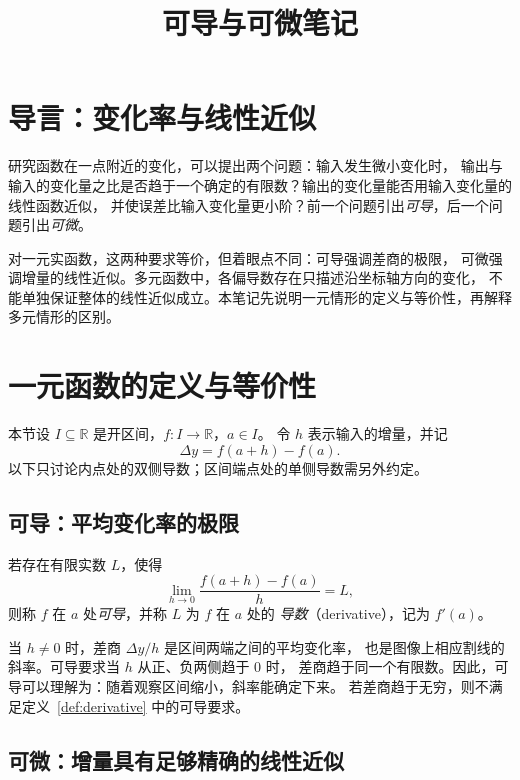 \documentclass[UTF8,12pt,a4paper,fontset=fandol]{ctexart}
\title{可导与可微笔记}
\author{}
\date{}
\begin{document}
\maketitle

\section{导言：变化率与线性近似}
\label{sec:motivation}

研究函数在一点附近的变化，可以提出两个问题：输入发生微小变化时，
输出与输入的变化量之比是否趋于一个确定的有限数？输出的变化量能否用输入变化量的线性函数近似，
并使误差比输入变化量更小阶？前一个问题引出\emph{可导}，后一个问题引出\emph{可微}。

对一元实函数，这两种要求等价，但着眼点不同：可导强调差商的极限，
可微强调增量的线性近似。多元函数中，各偏导数存在只描述沿坐标轴方向的变化，
不能单独保证整体的线性近似成立。本笔记先说明一元情形的定义与等价性，再解释多元情形的区别。

\section{一元函数的定义与等价性}
\label{sec:one-variable}

本节设 $I\subseteq\mathbb R$ 是开区间，$f:I\to\mathbb R$，$a\in I$。
令 $h$ 表示输入的增量，并记
\[
  \Delta y=f(a+h)-f(a).
\]
以下只讨论内点处的双侧导数；区间端点处的单侧导数需另外约定。

\subsection{可导：平均变化率的极限}

\begin{definition}[导数与可导]
\label{def:derivative}
若存在有限实数 $L$，使得
\begin{equation}\label{eq:derivative}
  \lim_{h\to0}\frac{f(a+h)-f(a)}{h}=L,
\end{equation}
则称 $f$ 在 $a$ 处\emph{可导}，并称 $L$ 为 $f$ 在 $a$ 处的
\emph{导数}（derivative），记为 $f'(a)$。
\end{definition}

当 $h\ne0$ 时，差商 $\Delta y/h$ 是区间两端之间的平均变化率，
也是图像上相应割线的斜率。可导要求当 $h$ 从正、负两侧趋于 $0$ 时，
差商趋于同一个有限数。因此，可导可以理解为：随着观察区间缩小，斜率能确定下来。
若差商趋于无穷，则不满足定义~\ref{def:derivative} 中的可导要求。

\subsection{可微：增量具有足够精确的线性近似}
\end{document}
